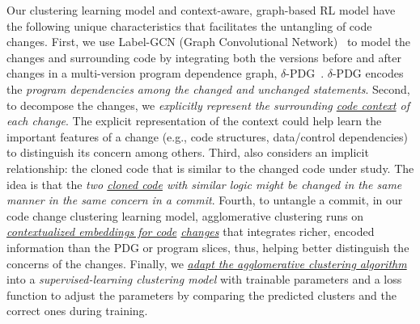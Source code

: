 Our clustering learning model and context-aware, graph-based RL model
have the following unique characteristics that facilitates the
untangling of code changes. First, we use Label-GCN (Graph
Convolutional Network)~\cite{label-gcn} to model the changes and
surrounding code by integrating both the versions before and after
changes in a multi-version program dependence graph,
$\delta$-PDG~\cite{flexeme-fse20}. $\delta$-PDG encodes the {\em
  program dependencies
  among the changed and unchanged
  statements}. Second, to decompose the changes, we {\em explicitly
  represent the surrounding \underline{code context} of each
  change}. The explicit representation of the context could help
{\tool} learn the important features of a change (e.g., code
structures, data/control dependencies) to distinguish its concern
among others.
%
Third, {\tool} also considers an implicit relationship:
the cloned code that is similar to the changed code under study.
%
The idea is that the {\em two \underline{cloned code} with similar
  logic might be changed in the same manner in the same concern in a
  commit}. Fourth, to untangle a commit, in our code change clustering
learning model, agglomerative clustering runs on {\em
  \underline{contextualized embeddings for code} \underline{changes}} that integrates richer, encoded information
than the PDG or program slices, thus, helping better distinguish the
concerns of the changes. Finally, we {\em \underline{adapt the
    agglomerative clustering algorithm}} into a {\em
  supervised-learning clustering model} with trainable parameters and
a loss function to adjust the parameters by comparing the predicted
clusters and the correct ones during training.




